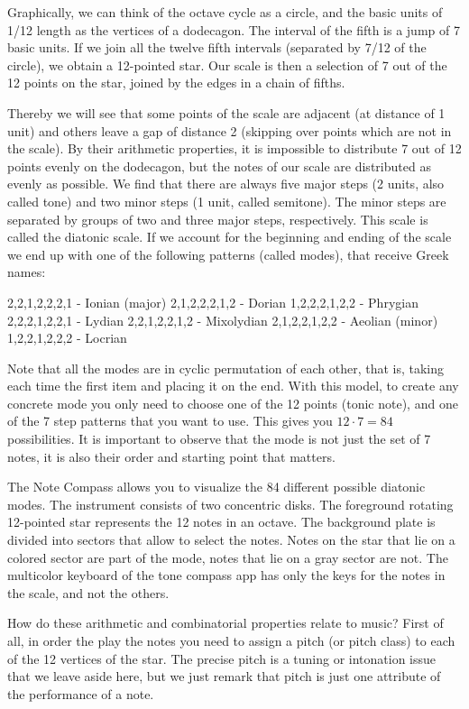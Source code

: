 Graphically, we can think of the octave cycle as a circle, and the basic units of 1/12 length as the vertices of a dodecagon. The interval of the fifth is a jump of 7 basic units. If we join all the twelve fifth intervals (separated by 7/12 of the circle), we obtain a 12-pointed star. Our scale is then a selection of 7 out of the 12 points on the star, joined by the edges in a chain of fifths.

Thereby we will see that some points of the scale are adjacent (at distance of 1 unit) and others  leave  a gap of distance 2 (skipping over points which are not in the scale). By their arithmetic properties, it is impossible to distribute 7 out of  12 points evenly on the dodecagon, but the notes of our scale are distributed as evenly as possible. We find that there are always five major steps (2 units, also called tone) and two minor steps (1 unit, called semitone). The minor steps are separated by groups of two and three major steps, respectively. This scale is called the diatonic scale. If we account for the beginning and ending of the scale we end up with one of the following patterns (called modes), that receive Greek names:

	2,2,1,2,2,2,1 - Ionian (major)
	2,1,2,2,2,1,2 - Dorian
	1,2,2,2,1,2,2 - Phrygian
	2,2,2,1,2,2,1 - Lydian
	2,2,1,2,2,1,2 - Mixolydian
	2,1,2,2,1,2,2 - Aeolian (minor)
	1,2,2,1,2,2,2 - Locrian

Note that all the modes are in cyclic permutation of each other, that is, taking each time the first item and placing it on the end. With this model, to create any concrete mode you only need to choose one of the 12 points (tonic note), and one of the 7 step patterns that you want to use. This gives you $12\cdot 7=84$ possibilities. It is important to observe that the mode is not just the set of 7 notes, it is also their order and starting point that matters.

The Note Compass allows you to visualize the 84 different possible diatonic modes. The instrument consists of two concentric disks. The foreground rotating 12-pointed star represents the 12 notes in an octave. The background plate is divided into sectors that allow to select the notes. Notes on the star that lie on a colored sector are part of the mode, notes that lie on a gray sector are not. The multicolor keyboard of the tone compass app has only the keys for the notes in the scale, and not the others.

How do these arithmetic and combinatorial properties relate to music? First of all, in order the play the notes you need to assign a pitch (or pitch class) to each of the 12 vertices of the star. The precise pitch is a tuning or intonation issue that we leave aside here, but we just remark that pitch is just one attribute of the performance of a note.


